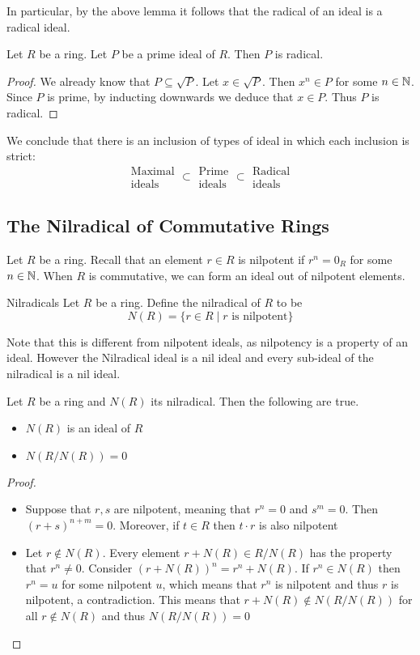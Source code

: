 \documentclass[a4paper]{article}
\begin{document}
In particular, by the above lemma it follows that the radical of an ideal is a radical ideal. 

\begin{lmm}{}{} Let $R$ be a ring. Let $P$ be a prime ideal of $R$. Then $P$ is radical. \tcbline
\begin{proof}
We already know that $P\subseteq\sqrt{P}$. Let $x\in\sqrt{P}$. Then $x^n\in P$ for some $n\in\mathbb{N}$. Since $P$ is prime, by inducting downwards we deduce that $x\in P$. Thus $P$ is radical. 
\end{proof}
\end{lmm}

We conclude that there is an inclusion of types of ideal in which each inclusion is strict: $$\substack{\text{Maximal}\\\text{ideals}}\subset\substack{\text{Prime}\\\text{ideals}}\subset\substack{\text{Radical}\\\text{ideals}}$$

\subsection{The Nilradical of Commutative Rings}
Let $R$ be a ring. Recall that an element $r\in R$ is nilpotent if $r^n=0_R$ for some $n\in\mathbb{N}$. When $R$ is commutative, we can form an ideal out of nilpotent elements. 

\begin{defn}{Nilradicals}{} Let $R$ be a ring. Define the nilradical of $R$ to be $$N(R)=\{r\in R\;|\;r\text{ is nilpotent}\}$$
\end{defn}

Note that this is different from nilpotent ideals, as nilpotency is a property of an ideal. However the Nilradical ideal is a nil ideal and every sub-ideal of the nilradical is a nil ideal. 

\begin{prp}{}{} Let $R$ be a ring and $N(R)$ its nilradical. Then the following are true. 
\begin{itemize}
\item $N(R)$ is an ideal of $R$
\item $N(R/N(R))=0$
\end{itemize}\tcbline
\begin{proof}~\\
\begin{itemize}
\item Suppose that $r,s$ are nilpotent, meaning that $r^n=0$ and $s^m=0$. Then $(r+s)^{n+m}=0$. Moreover, if $t\in R$ then $t\cdot r$ is also nilpotent
\item Let $r\notin N(R)$. Every element $r+N(R)\in R/N(R)$ has the property that $r^n\neq 0$. Consider $(r+N(R))^n=r^n+N(R)$. If $r^n\in N(R)$ then $r^n=u$ for some nilpotent $u$, which means that $r^n$ is nilpotent and thus $r$ is nilpotent, a contradiction. This means that $r+N(R)\notin N(R/N(R))$ for all $r\notin N(R)$ and thus $N(R/N(R))=0$
\end{itemize}
\end{proof}
\end{prp}
\end{document}
